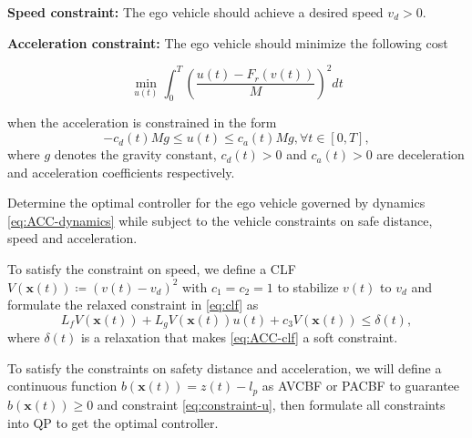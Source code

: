 \textbf{Speed constraint:} The ego vehicle should achieve a desired speed  $v_{d}>0.$

\textbf{Acceleration constraint:} The ego vehicle should minimize the following cost
\begin{small}
\begin{equation}
\label{eq:minimal-u}
\min_{u(t)} \int_{0}^{T}(\frac{u(t)-F_{r}(v(t))}{M})^{2}dt 
\end{equation}
\end{small}
when the acceleration is constrained in the form 
\begin{equation}
\label{eq:constraint-u}
-c_{d}(t)Mg\le u(t) \le c_{a}(t)Mg, \forall t \in [0,T], 
\end{equation}
where $g$ denotes the gravity constant, $c_{d}(t)>0$ and $c_{a}(t)>0$ are deceleration and acceleration coefficients respectively.
\begin{problem}
\label{prob:ACC-prob}
Determine the optimal controller for the ego vehicle governed by dynamics \eqref{eq:ACC-dynamics} while subject to the vehicle constraints on safe distance, speed and acceleration. 
\end{problem}

To satisfy the constraint on speed, we define a CLF $V(\boldsymbol{x}(t)) \coloneqq(v(t)-v_{d})^{2}$ with $c_{1}=c_{2}=1$ to stabilize $v(t)$ to $v_{d}$ and formulate the relaxed constraint in \eqref{eq:clf} as
\begin{equation}
\label{eq:ACC-clf}
L_{f}V(\boldsymbol{x}(t))+L_{g}V(\boldsymbol{x}(t))u(t)+c_{3}V(\boldsymbol{x}(t))\le \delta(t), 
\end{equation}
where $\delta(t)$ is a relaxation that makes \eqref{eq:ACC-clf} a soft constraint.

To satisfy the constraints on safety distance and acceleration, we will define a continuous function $b(\boldsymbol{x}(t))=z(t)-l_{p}$ as AVCBF or PACBF to guarantee $b(\boldsymbol{x}(t))\ge 0$ and constraint \eqref{eq:constraint-u}, then formulate all constraints into QP to get the optimal controller.